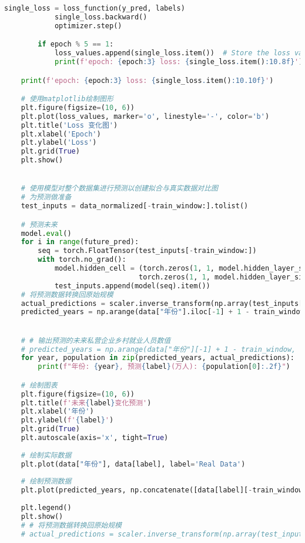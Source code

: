 \begin{lstlisting}[language=python,caption={数字农业渗透}]
            single_loss = loss_function(y_pred, labels)
            single_loss.backward()
            optimizer.step()

        if epoch % 5 == 1:
            loss_values.append(single_loss.item())  # Store the loss value
            print(f'epoch: {epoch:3} loss: {single_loss.item():10.8f}')

    print(f'epoch: {epoch:3} loss: {single_loss.item():10.10f}')

    # 使用matplotlib绘制图形
    plt.figure(figsize=(10, 6))
    plt.plot(loss_values, marker='o', linestyle='-', color='b')
    plt.title('Loss 变化图')
    plt.xlabel('Epoch')
    plt.ylabel('Loss')
    plt.grid(True)
    plt.show()


    # 使用模型对整个数据集进行预测以创建拟合与真实数据对比图
    # 为预测做准备
    test_inputs = data_normalized[-train_window:].tolist()

    # 预测未来
    model.eval()
    for i in range(future_pred):
        seq = torch.FloatTensor(test_inputs[-train_window:])
        with torch.no_grad():
            model.hidden_cell = (torch.zeros(1, 1, model.hidden_layer_size),
                                torch.zeros(1, 1, model.hidden_layer_size))
            test_inputs.append(model(seq).item())
    # 将预测数据转换回原始规模
    actual_predictions = scaler.inverse_transform(np.array(test_inputs[train_window:]).reshape(-1, 1))
    predicted_years = np.arange(data["年份"].iloc[-1] + 1 - train_window, data["年份"].iloc[-1] + 1 + future_pred)


    # # 输出预测的未来私营企业乡村就业人员数值
    # predicted_years = np.arange(data["年份"][-1] + 1 - train_window, data["年份"][-1] + 1 + future_pred)
    for year, population in zip(predicted_years, actual_predictions):
        print(f"年份: {year}, 预测{label}(万人): {population[0]:.2f}")

    # 绘制图表
    plt.figure(figsize=(10, 6))
    plt.title(f'未来{label}变化预测')
    plt.xlabel('年份')
    plt.ylabel(f'{label}')
    plt.grid(True)
    plt.autoscale(axis='x', tight=True)
    
    # 绘制实际数据
    plt.plot(data["年份"], data[label], label='Real Data')
    
    # 绘制预测数据
    plt.plot(predicted_years, np.concatenate([data[label][-train_window:], actual_predictions.ravel()]), label='Predictions', linestyle='--')
    
    plt.legend()
    plt.show()
    # # 将预测数据转换回原始规模
    # actual_predictions = scaler.inverse_transform(np.array(test_inputs[train_window:]).reshape(-1, 1))


\end{lstlisting}
